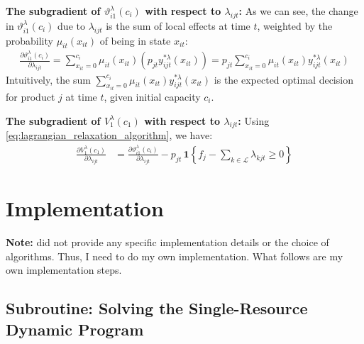 \documentclass[11pt]{article}
\begin{document}
\noindent
\textbf{The subgradient of $\vartheta^\lambda_{i1}(c_i)$ with respect to $\lambda_{ijt}$:}
As we can see, the change in $\vartheta^\lambda_{i1}(c_i)$ due to $\lambda_{ijt}$ is the sum of local effects at time $t$, weighted by the probability $\mu_{it}(x_{it})$ of being in state $x_{it}$:
\begin{align*}
\frac{\partial \vartheta^\lambda_{i1}(c_i)}{\partial \lambda_{ijt}} = \sum_{x_{it}=0}^{c_{i}} \mu_{it}(x_{it}) \left( p_{jt} y^{*\lambda}_{ijt}(x_{it}) \right) = p_{jt} \sum_{x_{it}=0}^{c_{i}} \mu_{it}(x_{it}) y^{*\lambda}_{ijt}(x_{it})
\end{align*}
Intuitively, the sum $\sum_{x_{it}=0}^{c_{i}} \mu_{it}(x_{it}) y^{*\lambda}_{ijt}(x_{it})$ is the expected optimal decision for product $j$ at time $t$, given initial capacity $c_i$.

\vspace{0.5cm}

\noindent
\textbf{The subgradient of $V^{\lambda}_{1}(c_{1})$ with respect to $\lambda_{ijt}$:}
Using \eqref{eq:lagrangian_relaxation_algorithm}, we have: 
\begin{align*}
    \frac{\partial V^{\lambda}_{1}(c_{1})}{\partial \lambda_{ijt}} 
    &= \frac{\partial \vartheta^\lambda_{i1}(c_{i})}{\partial \lambda_{ijt}} 
    - p_{jt} \,\mathbf{1}\left\{f_j - \sum_{k \in \mathcal{L}} \lambda_{kjt} \ge 0\right\} 
\end{align*}



\newpage


\section{Implementation}

\noindent
\textbf{Note:} \cite{topaloglu2009using} did not provide any specific implementation details or the choice of algorithms. Thus, I need to do my own implementation. What follows are my own implementation steps.

\vspace{0.5cm}



\subsection{Subroutine: Solving the Single-Resource Dynamic Program}
\end{document}
